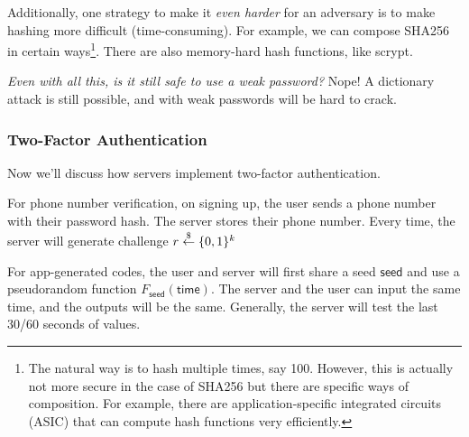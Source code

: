 Additionally, one strategy to make it \emph{even harder} for an adversary is to make hashing more difficult (time-consuming). For example, we can compose SHA256 in certain ways\footnote{The natural way is to hash multiple times, say 100. However, this is actually not more secure in the case of SHA256 but there are specific ways of composition. For example, there are application-specific integrated circuits (ASIC) that can compute hash functions very efficiently.}. There are also memory-hard hash functions, like scrypt.

\emph{Even with all this, is it still safe to use a weak password?} Nope! A dictionary attack is still possible, and with weak passwords will be hard to crack.

\subsubsection{Two-Factor Authentication}
Now we'll discuss how servers implement two-factor authentication.

For phone number verification, on signing up, the user sends a phone number with their password hash. The server stores their phone number. Every time, the server will generate challenge $r\overset{\$}{\leftarrow}\{0,1\}^k$

For app-generated codes, the user and server will first share a seed $\mathsf{seed}$ and use a pseudorandom function $F_\mathsf{seed}(\mathsf{time})$. The server and the user can input the same time, and the outputs will be the same. Generally, the server will test the last 30/60 seconds of values.









